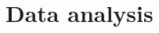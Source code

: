 \documentclass[11pt]{article}
\begin{document}





\section{Data analysis}\label{rbs:dataanalysis}
\end{document}
